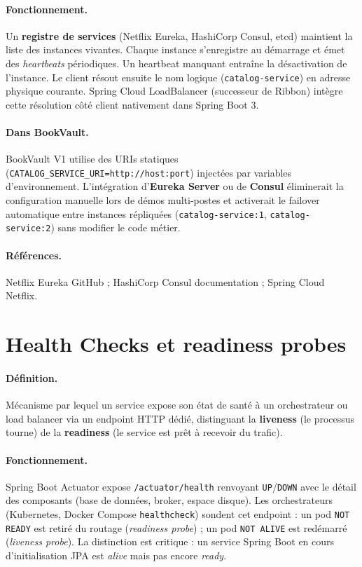 \documentclass[12pt,a4paper]{report}
\begin{document}
\paragraph{Fonctionnement.} Un \textbf{registre de services} (Netflix Eureka, HashiCorp Consul, etcd) maintient la liste des instances vivantes. Chaque instance s'enregistre au démarrage et émet des \textit{heartbeats} périodiques. Un heartbeat manquant entraîne la désactivation de l'instance. Le client résout ensuite le nom logique (\texttt{catalog-service}) en adresse physique courante. Spring Cloud LoadBalancer (successeur de Ribbon) intègre cette résolution côté client nativement dans Spring Boot 3.\par

\paragraph{Dans BookVault.} BookVault V1 utilise des URIs statiques (\texttt{CATALOG\_SERVICE\_URI=http://host:port}) injectées par variables d'environnement. L'intégration d'\textbf{Eureka Server} ou de \textbf{Consul} éliminerait la configuration manuelle lors de démos multi-postes et activerait le failover automatique entre instances répliquées (\texttt{catalog-service:1}, \texttt{catalog-service:2}) sans modifier le code métier.\par

\paragraph{Références.} Netflix Eureka GitHub ; HashiCorp Consul documentation ; Spring Cloud Netflix.\par


\section{Health Checks et readiness probes}

\paragraph{Définition.} Mécanisme par lequel un service expose son état de santé à un orchestrateur ou load balancer via un endpoint HTTP dédié, distinguant la \textbf{liveness} (le processus tourne) de la \textbf{readiness} (le service est prêt à recevoir du trafic).\par

\paragraph{Fonctionnement.} Spring Boot Actuator expose \texttt{/actuator/health} renvoyant \texttt{UP}/\texttt{DOWN} avec le détail des composants (base de données, broker, espace disque). Les orchestrateurs (Kubernetes, Docker Compose \texttt{healthcheck}) sondent cet endpoint : un pod \texttt{NOT READY} est retiré du routage (\textit{readiness probe}) ; un pod \texttt{NOT ALIVE} est redémarré (\textit{liveness probe}). La distinction est critique : un service Spring Boot en cours d'initialisation JPA est \textit{alive} mais pas encore \textit{ready}.\par
\end{document}
